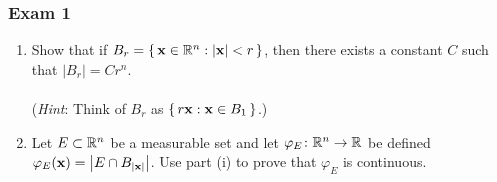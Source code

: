 \subsubsection{Exam 1}
\setcounter{exercise}{0}
\setcounter{equation}{0}


\begin{problem}
\end{problem}
\begin{solution}
\end{solution}

\begin{problem}
\end{problem}
\begin{solution}
\end{solution}

\begin{problem}
\hfill
\begin{enumerate}[label=(\roman*),noitemsep]
\item Show that if $B_r=\left\{\,\mathbf{x}\in\mathbb{R}^n:|\mathbf{x}|<r\,\right\}$,
  then there exists a constant $C$ such that $|B_r|=Cr^n$.
\\\\
(\emph{Hint}: Think of $B_r$ as $\left\{\,r\mathbf{x}:\mathbf{x}\in B_1\,\right\}$.)
\item Let $E\subset\mathbb{R}^n$ be a measurable set and let
  $\varphi_E\colon\mathbb{R}^n\to\mathbb{R}$ be defined
  $\varphi_E(\mathbf{x})=\left|E\cap B_{|\mathbf{x}|}\right|$. Use part (i) to prove
    that $\varphi_E$ is continuous.
\end{enumerate}
\end{problem}
